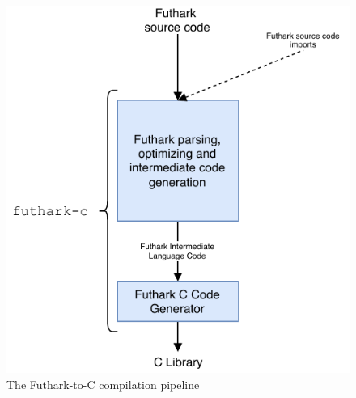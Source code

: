 \begin{figure}[H]
  \centering
  \includegraphics{chapters/figs/architecture/ccompiler.pdf}
  \caption{The Futhark-to-C compilation pipeline}
  \label{fig:ccompiler}
\end{figure}

